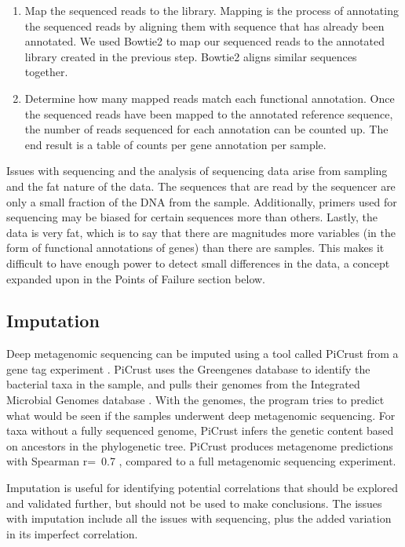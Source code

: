 \begin{enumerate}
\item Map the sequenced reads to the library.
Mapping is the process of annotating the sequenced reads by aligning them with sequence that has already been annotated. We used Bowtie2 \cite{langmead2012fast} to map our sequenced reads to the annotated library created in the previous step. Bowtie2 aligns similar sequences together.

\item Determine how many mapped reads match each functional annotation.
Once the sequenced reads have been mapped to the annotated reference sequence, the number of reads sequenced for each annotation can be counted up. The end result is a table of counts per gene annotation per sample.
\end{enumerate}

Issues with sequencing and the analysis of sequencing data arise from sampling and the fat nature of the data. The sequences that are read by the sequencer are only a small fraction of the DNA from the sample. Additionally, primers used for sequencing may be biased for certain sequences more than others. Lastly, the data is very fat, which is to say that there are magnitudes more variables (in the form of functional annotations of genes) than there are samples. This makes it difficult to have enough power to detect small differences in the data, a concept expanded upon in the Points of Failure section below.

\FloatBarrier

\subsection{Imputation}
Deep metagenomic sequencing can be imputed using a tool called PiCrust from a gene tag experiment \cite{langille2013predictive}. PiCrust uses the Greengenes database \cite{desantis2006greengenes} to identify the bacterial taxa in the sample, and pulls their genomes from the Integrated Microbial Genomes database \cite{markowitz2012img}. With the genomes, the program tries to predict what would be seen if the samples underwent deep metagenomic sequencing. For taxa without a fully sequenced genome, PiCrust infers the genetic content based on ancestors in the phylogenetic tree. PiCrust produces metagenome predictions with Spearman r=~0.7 \cite{langille2013predictive}, compared to a full metagenomic sequencing experiment.

Imputation is useful for identifying potential correlations that should be explored and validated further, but should not be used to make conclusions. The issues with imputation include all the issues with sequencing, plus the added variation in its imperfect correlation.

